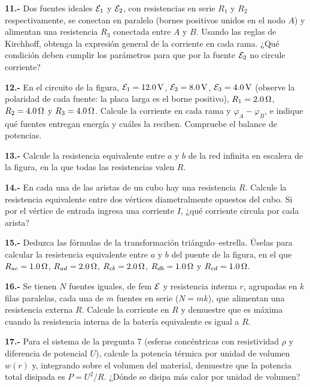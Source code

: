 \documentclass[11pt]{article}
\newcommand{\grupo}[1]{\par\medskip{\color{azul}\bfseries Grupo #1}\par\smallskip}
\newcommand{\p}[1]{\par\smallskip\textbf{#1.-} }
\begin{document}
\grupo{III}
\p{11} Dos fuentes ideales $\fem_1$ y $\fem_2$, con resistencias en serie $R_1$ y $R_2$ respectivamente, se conectan en paralelo (bornes positivos unidos en el nodo $A$) y alimentan una resistencia $R_3$ conectada entre $A$ y $B$. Usando las reglas de Kirchhoff, obtenga la expresión general de la corriente en cada rama. ¿Qué condición deben cumplir los parámetros para que por la fuente $\fem_2$ no circule corriente?

\p{12} En el circuito de la figura, $\fem_1=12.0\uu{V}$, $\fem_2=8.0\uu{V}$, $\fem_3=4.0\uu{V}$ (observe la polaridad de cada fuente: la placa larga es el borne positivo), $R_1=2.0\ohm$, $R_2=4.0\ohm$ y $R_3=4.0\ohm$. Calcule la corriente en cada rama y $\varphi_A-\varphi_B$, e indique qué fuentes entregan energía y cuáles la reciben. Compruebe el balance de potencias.
\begin{center}\circSdosQdoce\end{center}

\p{13} Calcule la resistencia equivalente entre $a$ y $b$ de la red infinita en escalera de la figura, en la que todas las resistencias valen $R$.
\begin{center}\end{center}

\p{14} En cada una de las aristas de un cubo hay una resistencia $R$. Calcule la resistencia equivalente entre dos vértices diametralmente opuestos del cubo. Si por el vértice de entrada ingresa una corriente $I$, ¿qué corriente circula por cada arista?

\p{15} Deduzca las fórmulas de la transformación triángulo--estrella. Úselas para calcular la resistencia equivalente entre $a$ y $b$ del puente de la figura, en el que $R_{ac}=1.0\ohm$, $R_{ad}=2.0\ohm$, $R_{cb}=2.0\ohm$, $R_{db}=1.0\ohm$ y $R_{cd}=1.0\ohm$.
\begin{center}\end{center}

\grupo{IV}
\p{16} Se tienen $N$ fuentes iguales, de fem $\fem$ y resistencia interna $r$, agrupadas en $k$ filas paralelas, cada una de $m$ fuentes en serie ($N=mk$), que alimentan una resistencia externa $R$. Calcule la corriente en $R$ y demuestre que es máxima cuando la resistencia interna de la batería equivalente es igual a $R$.

\p{17} Para el sistema de la pregunta 7 (esferas concéntricas con resistividad $\rho$ y diferencia de potencial $U$), calcule la potencia térmica por unidad de volumen $w(r)$ y, integrando sobre el volumen del material, demuestre que la potencia total disipada es $P=U^2/R$. ¿Dónde se disipa más calor por unidad de volumen?
\end{document}
